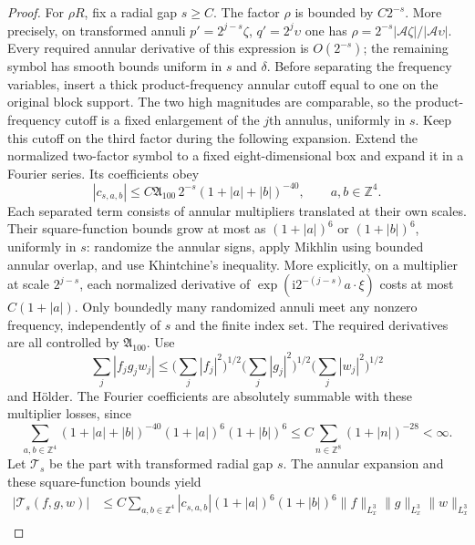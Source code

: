 \documentclass[11pt,a4paper]{article}
\numberwithin{equation}{section}
\newcommand{\ii}{\mathrm{i}}
\theoremstyle{definition}
\begin{document}
\begin{proof}
For $\rho R$, fix a radial gap $s\geq C$. The factor $\rho$ is bounded
by $C2^{-s}$. More precisely, on transformed annuli
$p'=2^{j-s}\zeta$, $q'=2^j\upsilon$ one has
$\rho=2^{-s}|\mathcal A\zeta|/|\mathcal A\upsilon|$.
Every required annular derivative of this expression is $O(2^{-s})$;
the remaining symbol has smooth bounds uniform in $s$ and $\delta$.
Before separating the frequency variables, insert a thick product-frequency
annular cutoff equal to one on the original block support. The two
high magnitudes are comparable, so the product-frequency cutoff is a fixed
enlargement of the $j$th annulus, uniformly in $s$. Keep this cutoff
on the third factor during the following expansion.
Extend the normalized two-factor symbol to a fixed eight-dimensional
box and expand it in a Fourier series. Its coefficients obey
\begin{equation*}
|c_{s,a,b}|\leq C\mathfrak A_{100}\,2^{-s}
(1+|a|+|b|)^{-40},\qquad a,b\in\mathbb Z^4.
\end{equation*}
Each separated term consists of annular
multipliers translated at their own scales. Their square-function bounds
grow at most as $(1+|a|)^6$ or $(1+|b|)^6$, uniformly in $s$: randomize
the annular signs, apply Mikhlin using bounded annular overlap, and use
Khintchine's inequality. More explicitly, on a multiplier at scale
$2^{j-s}$, each normalized derivative of
$\exp(\ii 2^{-(j-s)}a\cdot\xi)$ costs at most $C(1+|a|)$.
Only boundedly many randomized annuli meet any nonzero frequency,
independently of $s$ and the finite index set. The required derivatives
are all controlled by $\mathfrak A_{100}$.
Use
\begin{equation*}
\sum_j|f_jg_jw_j|
\leq\bigg(\sum_j|f_j|^2\bigg)^{1/2}
     \bigg(\sum_j|g_j|^2\bigg)^{1/2}
     \bigg(\sum_j|w_j|^2\bigg)^{1/2}
\end{equation*}
and H\"older. The Fourier coefficients are absolutely summable with
these multiplier losses, since
\begin{equation*}
\sum_{a,b\in\mathbb Z^4}
(1+|a|+|b|)^{-40}(1+|a|)^6(1+|b|)^6
\leq C\sum_{n\in\mathbb Z^8}(1+|n|)^{-28}<\infty.
\end{equation*}
Let $\mathcal T_s$ be the part with transformed radial gap $s$.
The annular expansion and these square-function bounds yield
\begin{equation*}
\begin{aligned}
|\mathcal T_s(f,g,w)|
&\leq C\sum_{a,b\in\mathbb Z^4}|c_{s,a,b}|
 (1+|a|)^6(1+|b|)^6
 \|f\|_{L^3_x}\|g\|_{L^3_x}\|w\|_{L^3_x}\\

\end{aligned}
\end{equation*}
\end{proof}
\end{document}
